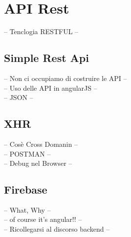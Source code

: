 \section{API Rest}
-- Tenclogia RESTFUL --\\
\subsection{Simple Rest Api}
-- Non ci occupiamo di costruire le API --\\
-- Uso delle API in angularJS --\\
-- JSON --\\
\subsection{XHR}
-- Cosè Cross Domanin --\\
-- POSTMAN --\\
-- Debug nel Browser --\\
\subsection{Firebase}
-- What, Why --\\
-- of course it's angular!! --\\
-- Ricollegarsi al discorso backend --